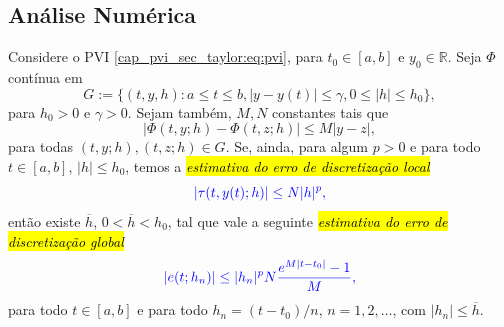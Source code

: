 \subsection{Análise Numérica}

\begin{teo}\label{cap_pvi_sec_taylor:teo:conv}
  Considere o PVI \eqref{cap_pvi_sec_taylor:eq:pvi}, para $t_0\in [a, b]$ e $y_0\in\mathbb{R}$. Seja $\Phi$ contínua em
  \begin{equation}
    G := \{(t, y, h): a\leq t\leq b, |y-y(t)|\leq\gamma, 0\leq|h|\leq h_0\},
  \end{equation}
  para $h_0>0$ e $\gamma>0$. Sejam também, $M, N$ constantes tais que
  \begin{equation}
    \left|\Phi(t, y; h) - \Phi(t, z; h)\right| \leq M|y - z|,
  \end{equation}
  para todas $(t, y; h), (t, z; h)\in G$. Se, ainda, para algum $p>0$ e para todo $t\in [a, b]$, $|h|\leq h_0$, temos a \hl{\emph{estimativa do erro de discretização local}}
  \begin{equation}\label{cap_pvi_sec_taylor:eq:est_erro_local}\color{blue}\left|\tau(t, y(t); h)\right| \leq N |h|^p,
  \end{equation}
  então existe $\overline{h}$, $0<\overline{h}<h_0$, tal que vale a seguinte \hl{\emph{estimativa do erro de discretização global}}
  \begin{equation}\label{cap_pvi_sec_taylor:eq:est_erro_global}\color{blue}|e(t; h_n)| \leq |h_n|^pN\frac{e^{M|t-t_0|}-1}{M},
  \end{equation}
  para todo $t\in [a, b]$ e para todo $h_n = (t-t_0)/n$, $n=1, 2, \ldots$, com $|h_n|\leq \overline{h}$.
\end{teo}
